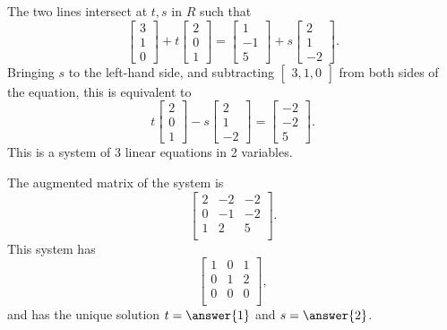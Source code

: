 \documentclass{ximera}
\begin{document}
\begin{example}
  The two lines intersect at $t,s$ in $R$ such
  that
  \begin{equation*}
    \begin{bmatrix} 3 \\ 1 \\ 0 \end{bmatrix}
    + t \begin{bmatrix} 2 \\ 0 \\ 1 \end{bmatrix}
    = \begin{bmatrix} 1 \\ -1 \\ 5 \end{bmatrix}
    + s \begin{bmatrix} 2 \\ 1 \\ -2 \end{bmatrix}.
  \end{equation*}
  Bringing $s$ to the left-hand side, and subtracting $\begin{bmatrix}3,1,0\end{bmatrix}$
  from both sides of the equation, this is equivalent to
  \begin{equation*}
    t \begin{bmatrix} 2 \\ 0 \\ 1 \end{bmatrix}
    - s \begin{bmatrix} 2 \\ 1 \\ -2 \end{bmatrix}
    = \begin{bmatrix} -2 \\ -2 \\ 5 \end{bmatrix}.
  \end{equation*}
  This is a system of 3 linear equations in 2 variables. 
  
  The
  augmented matrix of the system is
  \begin{equation*}
    \begin{bmatrix}
      2 & -2 & -2 \\
      0 & -1 & -2 \\
      1 & 2 & 5   \\
    \end{bmatrix}.
  \end{equation*}
  This system has {\rref}
  \begin{equation*}
    \begin{bmatrix}
      1 & 0 & 1 \\
      0 & 1 & 2 \\
      0 & 0 & 0 \\
    \end{bmatrix},
  \end{equation*}
  and has the unique solution $t=\answer{1}$ and $s=\answer{2}$.
  

\end{example}
\end{document}
